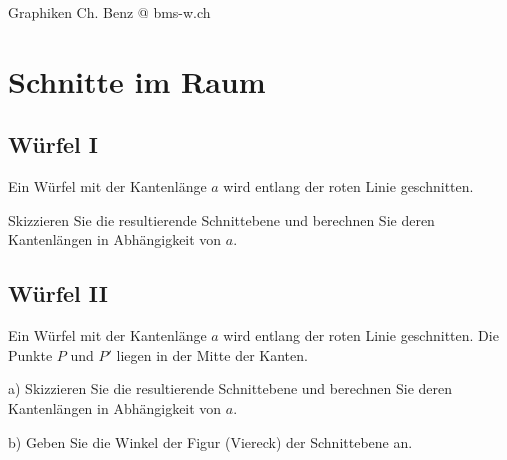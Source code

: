 



\usepackage{amssymb} %
\renewcommand{\metaHeaderLine}{Arbeitsblatt Stereometrie}
\renewcommand{\arbeitsblattTitel}{Schnitte im Raum}

\arbeitsblattHeader{}

Graphiken Ch. Benz @ bms-w.ch

\setcounter{aufgabennummer}{1}


\section{Schnitte im Raum}

\subsection{Würfel I}

Ein Würfel mit der Kantenlänge $a$ wird entlang der roten
Linie geschnitten.

Skizzieren Sie die resultierende Schnittebene und berechnen
Sie deren Kantenlängen in Abhängigkeit von $a$.


\subsection{Würfel II}


Ein Würfel mit der Kantenlänge $a$ wird entlang der roten Linie
geschnitten. Die Punkte $P$ und $P'$ liegen in der Mitte der Kanten.

a) Skizzieren Sie die resultierende Schnittebene und berechnen
Sie deren Kantenlängen in Abhängigkeit von $a$.

b) Geben Sie die Winkel der Figur (Viereck) der Schnittebene an.


